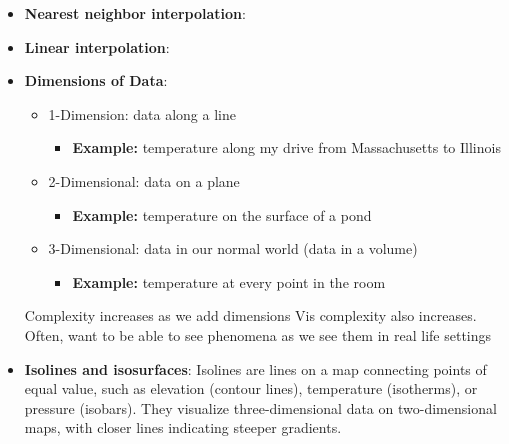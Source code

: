 \documentclass{report}
\begin{document}
\begin{itemize}
\begin{itemize}
                \item \textbf{Geometry:} the spatial positions of the data (points)
                \item \textbf{Topology:} how the points are connected (cells)
            \end{itemize}
            Type of grid determines how much data needs to be stored for both geometry and topology
        \item \textbf{Nearest neighbor interpolation}: 
            \bigbreak \noindent 
        \item \textbf{Linear interpolation}: 
            \bigbreak \noindent 
        \item \textbf{Dimensions of Data}: 
            \begin{itemize}
                \item 1-Dimension: data along a line
                    \begin{itemize}
                        \item \textbf{Example:} temperature along my drive from Massachusetts to Illinois
                    \end{itemize}
                \item 2-Dimensional: data on a plane
                    \begin{itemize}
                        \item \textbf{Example:} temperature on the surface of a pond
                    \end{itemize}
                \item 3-Dimensional: data in our normal world (data in a volume)
                    \begin{itemize}
                        \item \textbf{Example:} temperature at every point in the room 
                    \end{itemize}
            \end{itemize}
            Complexity increases as we add dimensions Vis complexity also increases. Often, want to be able to see phenomena as we see them in real life settings
        \item \textbf{Isolines and isosurfaces}: Isolines are lines on a map connecting points of equal value, such as elevation (contour lines), temperature (isotherms), or pressure (isobars). They visualize three-dimensional data on two-dimensional maps, with closer lines indicating steeper gradients. 

\end{itemize}
\end{document}
